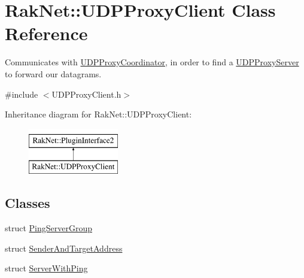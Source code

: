 \hypertarget{class_rak_net_1_1_u_d_p_proxy_client}{\section{Rak\-Net\-:\-:U\-D\-P\-Proxy\-Client Class Reference}
\label{class_rak_net_1_1_u_d_p_proxy_client}
}


Communicates with \hyperlink{class_rak_net_1_1_u_d_p_proxy_coordinator}{U\-D\-P\-Proxy\-Coordinator}, in order to find a \hyperlink{class_rak_net_1_1_u_d_p_proxy_server}{U\-D\-P\-Proxy\-Server} to forward our datagrams.  




{\ttfamily \#include $<$U\-D\-P\-Proxy\-Client.\-h$>$}

Inheritance diagram for Rak\-Net\-:\-:U\-D\-P\-Proxy\-Client\-:\begin{figure}[H]
\begin{center}
\leavevmode
\includegraphics[height=2.000000cm]{class_rak_net_1_1_u_d_p_proxy_client}
\end{center}
\end{figure}
\subsection*{Classes}
\begin{DoxyCompactItemize}
\item 
struct \hyperlink{struct_rak_net_1_1_u_d_p_proxy_client_1_1_ping_server_group}{Ping\-Server\-Group}
\item 
struct \hyperlink{struct_rak_net_1_1_u_d_p_proxy_client_1_1_sender_and_target_address}{Sender\-And\-Target\-Address}
\item 
struct \hyperlink{struct_rak_net_1_1_u_d_p_proxy_client_1_1_server_with_ping}{Server\-With\-Ping}
\end{DoxyCompactItemize}
